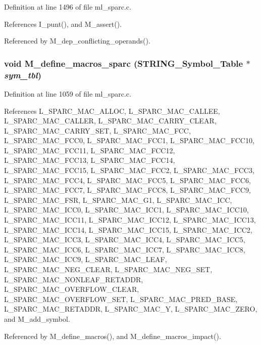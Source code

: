 Definition at line 1496 of file ml\_\-sparc.c.

References I\_\-punt(), and M\_\-assert().

Referenced by M\_\-dep\_\-conflicting\_\-operands().
\subsubsection{\setlength{\rightskip}{0pt plus 5cm}void M\_\-define\_\-macros\_\-sparc (\bf{STRING\_\-Symbol\_\-Table} $\ast$ {\em sym\_\-tbl})}\label{ml__sparc_8c_e664de7899500ee62b3ce59710006d2a}




Definition at line 1059 of file ml\_\-sparc.c.

References L\_\-SPARC\_\-MAC\_\-ALLOC, L\_\-SPARC\_\-MAC\_\-CALLEE, L\_\-SPARC\_\-MAC\_\-CALLER, L\_\-SPARC\_\-MAC\_\-CARRY\_\-CLEAR, L\_\-SPARC\_\-MAC\_\-CARRY\_\-SET, L\_\-SPARC\_\-MAC\_\-FCC, L\_\-SPARC\_\-MAC\_\-FCC0, L\_\-SPARC\_\-MAC\_\-FCC1, L\_\-SPARC\_\-MAC\_\-FCC10, L\_\-SPARC\_\-MAC\_\-FCC11, L\_\-SPARC\_\-MAC\_\-FCC12, L\_\-SPARC\_\-MAC\_\-FCC13, L\_\-SPARC\_\-MAC\_\-FCC14, L\_\-SPARC\_\-MAC\_\-FCC15, L\_\-SPARC\_\-MAC\_\-FCC2, L\_\-SPARC\_\-MAC\_\-FCC3, L\_\-SPARC\_\-MAC\_\-FCC4, L\_\-SPARC\_\-MAC\_\-FCC5, L\_\-SPARC\_\-MAC\_\-FCC6, L\_\-SPARC\_\-MAC\_\-FCC7, L\_\-SPARC\_\-MAC\_\-FCC8, L\_\-SPARC\_\-MAC\_\-FCC9, L\_\-SPARC\_\-MAC\_\-FSR, L\_\-SPARC\_\-MAC\_\-G1, L\_\-SPARC\_\-MAC\_\-ICC, L\_\-SPARC\_\-MAC\_\-ICC0, L\_\-SPARC\_\-MAC\_\-ICC1, L\_\-SPARC\_\-MAC\_\-ICC10, L\_\-SPARC\_\-MAC\_\-ICC11, L\_\-SPARC\_\-MAC\_\-ICC12, L\_\-SPARC\_\-MAC\_\-ICC13, L\_\-SPARC\_\-MAC\_\-ICC14, L\_\-SPARC\_\-MAC\_\-ICC15, L\_\-SPARC\_\-MAC\_\-ICC2, L\_\-SPARC\_\-MAC\_\-ICC3, L\_\-SPARC\_\-MAC\_\-ICC4, L\_\-SPARC\_\-MAC\_\-ICC5, L\_\-SPARC\_\-MAC\_\-ICC6, L\_\-SPARC\_\-MAC\_\-ICC7, L\_\-SPARC\_\-MAC\_\-ICC8, L\_\-SPARC\_\-MAC\_\-ICC9, L\_\-SPARC\_\-MAC\_\-LEAF, L\_\-SPARC\_\-MAC\_\-NEG\_\-CLEAR, L\_\-SPARC\_\-MAC\_\-NEG\_\-SET, L\_\-SPARC\_\-MAC\_\-NONLEAF\_\-RETADDR, L\_\-SPARC\_\-MAC\_\-OVERFLOW\_\-CLEAR, L\_\-SPARC\_\-MAC\_\-OVERFLOW\_\-SET, L\_\-SPARC\_\-MAC\_\-PRED\_\-BASE, L\_\-SPARC\_\-MAC\_\-RETADDR, L\_\-SPARC\_\-MAC\_\-Y, L\_\-SPARC\_\-MAC\_\-ZERO, and M\_\-add\_\-symbol.

Referenced by M\_\-define\_\-macros(), and M\_\-define\_\-macros\_\-impact().
